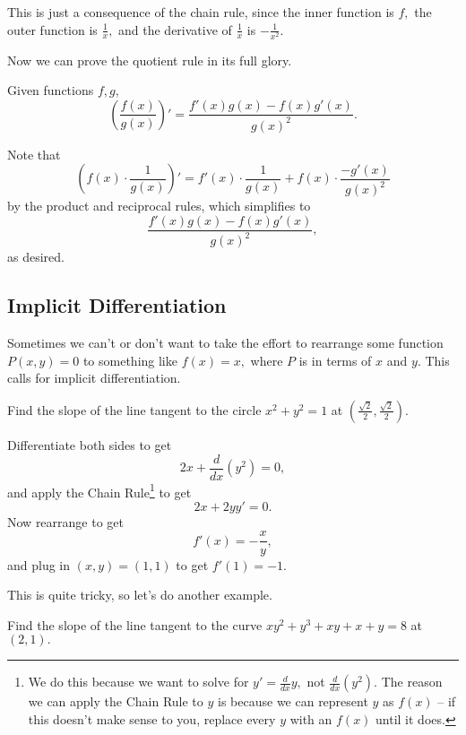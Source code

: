 \documentclass[blue,onecol]{shooting}
\begin{document}
\begin{pro}
This is just a consequence of the chain rule, since the inner function is $f,$ the outer function is $\frac{1}{x},$ and the derivative of $\frac{1}{x}$ is $-\frac{1}{x^2}.$
\end{pro}

Now we can prove the quotient rule in its full glory.

\begin{theo}
Given functions $f,g,$
\[\left(\frac{f(x)}{g(x)}\right)'=\frac{f'(x)g(x)-f(x)g'(x)}{g(x)^2}.\]
\end{theo}

\begin{pro}
Note that \[\left(f(x)\cdot \frac{1}{g(x)}\right)'=f'(x)\cdot \frac{1}{g(x)}+f(x)\cdot\frac{-g'(x)}{g(x)^2}\]
by the product and reciprocal rules, which simplifies to
\[\frac{f'(x)g(x)-f(x)g'(x)}{g(x)^2},\]
as desired.
\end{pro}

\subsection{Implicit Differentiation}
Sometimes we can't or don't want to take the effort to rearrange some function $P(x,y)=0$ to something like $f(x)=x,$ where $P$ is in terms of $x$ and $y.$ This calls for implicit differentiation.

\begin{exam}
Find the slope of the line tangent to the circle $x^2+y^2=1$ at $(\frac{\sqrt{2}}{2},\frac{\sqrt{2}}{2}).$
\end{exam}

\begin{sol}
Differentiate both sides to get
\[2x+\frac{d}{dx}(y^2)=0,\]
and apply the Chain Rule\footnote{We do this because we want to solve for $y'=\frac{d}{dx}y,$ not $\frac{d}{dx}(y^2).$ The reason we can apply the Chain Rule to $y$ is because we can represent $y$ as $f(x)$ -- if this doesn't make sense to you, replace every $y$ with an $f(x)$ until it does.} to get
\[2x+2yy'=0.\]
Now rearrange to get
\[f'(x)=-\frac{x}{y},\]
and plug in $(x,y)=(1,1)$ to get $f'(1)=-1.$
\end{sol}

This is quite tricky, so let's do another example.

\begin{exam}
Find the slope of the line tangent to the curve $xy^2+y^3+xy+x+y=8$ at $(2,1).$
\end{exam}
\end{document}
